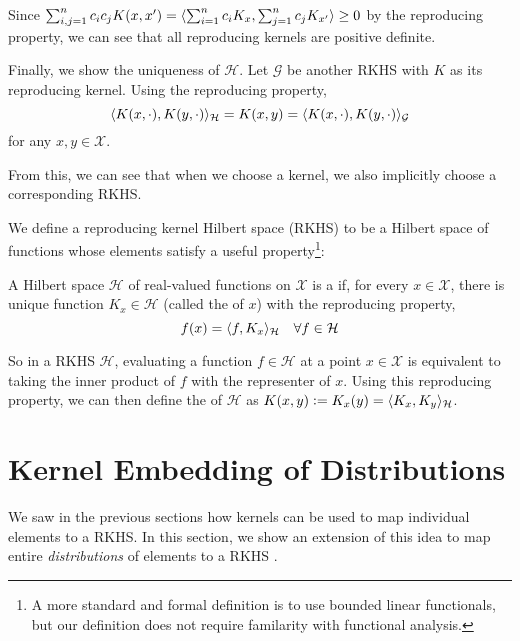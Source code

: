 Since $\sum_{i,j=1}^n c_i c_j K(x, x^\prime) = \langle\sum_{i=1}^n c_i K_x, \sum_{j=1}^n c_j K_{x^\prime}\rangle \geq 0$ by the reproducing property, we can see that all reproducing kernels are positive definite.


Finally, we show the uniqueness of $\mathcal{H}$. Let $\mathcal{G}$ be another RKHS with $K$ as its reproducing kernel. Using the reproducing property,
%
\begin{equation}
	\langle K(x, \cdot), K(y, \cdot)\rangle_\mathcal{H} = K(x, y) = \langle K(x, \cdot), K(y, \cdot)\rangle_\mathcal{G}
\end{equation}
%
for any $x, y \in \mathcal{X}$. 

From this, we can see that when we choose a kernel, we also implicitly choose a corresponding RKHS.

We define a reproducing kernel Hilbert space (RKHS) to be a Hilbert space of functions whose elements satisfy a useful property\footnote{A more standard and formal definition is to use bounded linear functionals, but our definition does not require familarity with functional analysis. \needcite}:
%
\begin{definition}
A Hilbert space $\mathcal{H}$ of real-valued functions on $\mathcal{X}$ is a  if, for every $x \in \mathcal{X}$, there is unique function $K_x \in \mathcal{H}$ (called the  of $x$) with the reproducing property,
\begin{equation}
  f(x) = \langle f, K_x\rangle_\mathcal{H} \quad \forall f \in \mathcal{H}
\end{equation}
\end{definition}

So in a RKHS $\mathcal{H}$, evaluating a function $f \in \mathcal{H}$ at a point $x \in \mathcal{X}$ is equivalent to taking the inner product of $f$ with the representer of $x$. Using this reproducing property, we can then define the  of $\mathcal{H}$ as $K(x, y) \vcentcolon= K_x(y) = \langle K_x, K_y\rangle_\mathcal{H}$.

\section{Kernel Embedding of Distributions}
We saw in the previous sections how kernels can be used to map individual elements to a RKHS. In this section, we show an extension of this idea to map entire \emph{distributions} of elements to a RKHS \citep{smola2007hilbert}.

